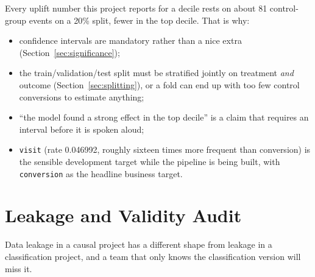\documentclass[11pt,a4paper]{article}
\begin{document}
\begin{keybox}
Every uplift number this project reports for a decile rests on about 81 control-group events on a
20\% split, fewer in the top decile.
That is why:
\begin{itemize}
\item confidence intervals are mandatory rather than a nice extra (Section~\ref{sec:significance});
\item the train/validation/test split must be stratified jointly on treatment \emph{and} outcome
(Section~\ref{sec:splitting}), or a fold can end up with too few control conversions to estimate
anything;
\item ``the model found a strong effect in the top decile'' is a claim that requires an interval
before it is spoken aloud;
\item \texttt{visit} (rate 0.046992, roughly sixteen times more frequent than conversion) is the
sensible development target while the pipeline is being built, with \texttt{conversion} as the
headline business target.
\end{itemize}
\end{keybox}

\section{Leakage and Validity Audit}
\label{sec:leakage}

Data leakage in a causal project has a different shape from leakage in a classification project,
and a team that only knows the classification version will miss it.
\end{document}
